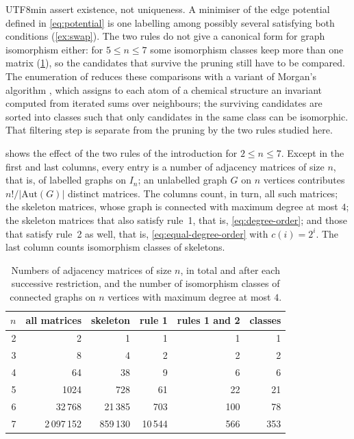 \documentclass[reqno]{amsart}
\theoremstyle{definition}
\numberwithin{equation}{section}
\begin{document}
\begin{CJK*}{UTF8}{min}
 assert existence, not uniqueness.
A minimiser of the edge potential defined in \eqref{eq:potential} is one labelling among
possibly several satisfying both conditions (\cref{ex:swap}). The two rules do not give a canonical form for graph isomorphism
either: for \(5\leq n\leq7\) some isomorphism classes keep more than one matrix
(\cref{tab:counts}), so the candidates that survive the pruning still have to
be compared. The enumeration of \cite{smooth-pudding-2024} reduces these
comparisons with a variant of Morgan's algorithm \cite{morgan-1965}, which
assigns to each atom of a chemical structure an invariant computed from
iterated sums over neighbours; the surviving candidates are sorted into classes
such that only candidates in the same class can be isomorphic. That filtering
step is separate from the pruning by the two rules studied here.

 shows the effect of the two rules of the introduction for
\(2\leq n\leq7\). Except in the first and last columns, every entry is a number of adjacency
matrices of size \(n\), that is, of labelled graphs on \(I_n\); an unlabelled
graph \(G\) on \(n\) vertices contributes \(n!/|\mathrm{Aut}(G)|\) distinct
matrices. The columns count, in turn, all such matrices; the skeleton
matrices, whose graph is connected with maximum degree at most \(4\); the
skeleton matrices that also satisfy rule~1, that is, \eqref{eq:degree-order};
and those that satisfy rule~2 as well, that is, \eqref{eq:equal-degree-order}
with \(c(i)=2^i\). The last column counts isomorphism classes of skeletons.

\begin{table}[ht]
  \centering
  \caption{Numbers of adjacency matrices of size \(n\), in total and after each
  successive restriction, and the number of isomorphism classes of connected
  graphs on \(n\) vertices with maximum degree at most \(4\).}
  \begin{tabular}{rrrrrr}
    \hline
    \(n\) & all matrices & skeleton & rule 1 & rules 1 and 2
      & classes\\
    \hline
    2 & 2 & 1 & 1 & 1 & 1\\
    3 & 8 & 4 & 2 & 2 & 2\\
    4 & 64 & 38 & 9 & 6 & 6\\
    5 & 1024 & 728 & 61 & 22 & 21\\
    6 & 32\,768 & 21\,385 & 703 & 100 & 78\\
    7 & 2\,097\,152 & 859\,130 & 10\,544 & 566 & 353\\
    \hline
  \end{tabular}
  \label{tab:counts}
\end{table}


\end{CJK*}
\end{document}
